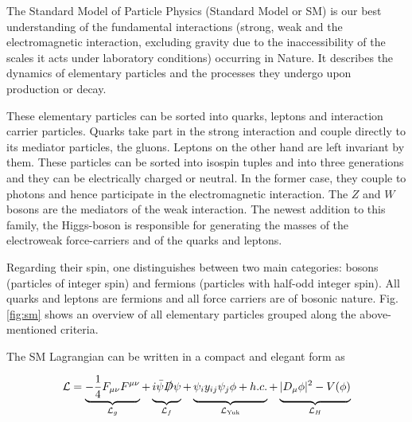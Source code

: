 \label{ch:theory}


The Standard Model of Particle Physics (Standard Model or SM) is our best understanding of the fundamental interactions (strong, weak and the electromagnetic interaction, excluding gravity due to the inaccessibility of the scales it acts under laboratory conditions) occurring in Nature. It describes the dynamics of elementary particles and the processes they undergo upon production or decay.

These elementary particles can be sorted into quarks, leptons and interaction carrier particles. Quarks take part in the strong interaction and couple directly to its mediator particles, the gluons. Leptons on the other hand are left invariant by them. These particles can be sorted into isospin tuples and into three generations and they can be electrically charged or neutral. In the former case, they couple to photons and hence participate in the electromagnetic interaction. The $Z$ and $W$ bosons are the mediators of the weak interaction. The newest addition to this family, the Higgs-boson is responsible for generating the masses of the electroweak force-carriers and of the quarks and leptons.

Regarding their spin, one distinguishes between two main categories: bosons (particles of integer spin) and fermions (particles with half-odd integer spin). All quarks and leptons are fermions and all force carriers are of bosonic nature. Fig. \ref{fig:sm} shows an overview of all elementary particles grouped along the above-mentioned criteria.


The SM Lagrangian can be written in a compact and elegant form as


\begin{equation}
		\mathcal{L} = \underbrace{-\frac{1}{4}F_{\mu\nu}F^{\mu\nu}}_{\mathcal{L}_g} + \underbrace{\vphantom{-\frac{1}{4}F_{\mu\nu}F^{\mu\nu}}i \bar{\psi}\slashed{D}\psi}_{\mathcal{L}_f} + \underbrace{\vphantom{-\frac{1}{4}F_{\mu\nu}F^{\mu\nu}}\psi_iy_{ij}\psi_j\phi + h.c.}_{\mathcal{L}_\text{Yuk}} + \underbrace{\vphantom{-\frac{1}{4}F_{\mu\nu}F^{\mu\nu}}|D_\mu\phi|^2 - V(\phi)}_{\mathcal{L}_H}
	\label{eq:lagrangian}
\end{equation}

